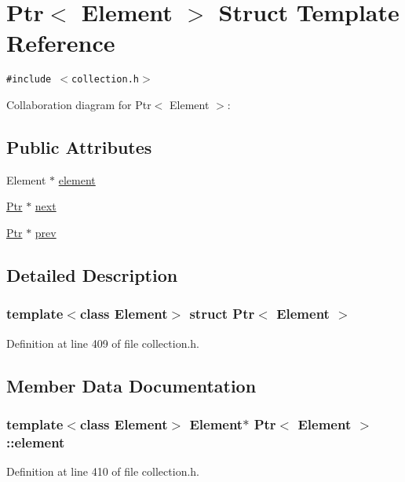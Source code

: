 \hypertarget{structPtr}{
\section{Ptr$<$ Element $>$ Struct Template Reference}
\label{structPtr}
}
{\tt \#include $<$collection.h$>$}

Collaboration diagram for Ptr$<$ Element $>$:\subsection*{Public Attributes}
\begin{CompactItemize}
\item 
Element $\ast$ \hyperlink{structPtr_2086fc52e0fd6f92bd538dc6ff2dff74}{element}
\item 
\hyperlink{structPtr}{Ptr} $\ast$ \hyperlink{structPtr_c35273d22c86522bff2de62e103f6114}{next}
\item 
\hyperlink{structPtr}{Ptr} $\ast$ \hyperlink{structPtr_e2ac6d1ef67208a954ad1d3d7d9785bf}{prev}
\end{CompactItemize}


\subsection{Detailed Description}
\subsubsection*{template$<$class Element$>$ struct Ptr$<$ Element $>$}



Definition at line 409 of file collection.h.

\subsection{Member Data Documentation}
\hypertarget{structPtr_2086fc52e0fd6f92bd538dc6ff2dff74}{
\subsubsection[{element}]{\setlength{\rightskip}{0pt plus 5cm}template$<$class Element$>$ Element$\ast$ {\bf Ptr}$<$ Element $>$::{\bf element}}}
\label{structPtr_2086fc52e0fd6f92bd538dc6ff2dff74}




Definition at line 410 of file collection.h.

